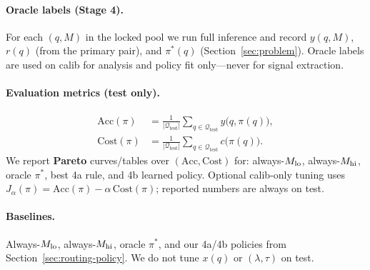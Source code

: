 \paragraph{Oracle labels (Stage 4).}
For each $(q,M)$ in the locked pool we run full inference and record $y(q,M)$, $r(q)$ (from the primary pair), and $\pi^*(q)$ (Section~\ref{sec:problem}).
Oracle labels are used on calib for analysis and policy fit only---never for signal extraction.

\paragraph{Evaluation metrics (test only).}
\begin{align}
  \mathrm{Acc}(\pi) &= \frac{1}{|\mathcal{Q}_{\text{test}}|} \sum_{q\in\mathcal{Q}_{\text{test}}} y\big(q,\pi(q)\big), \\
  \mathrm{Cost}(\pi) &= \frac{1}{|\mathcal{Q}_{\text{test}}|} \sum_{q\in\mathcal{Q}_{\text{test}}} c\big(\pi(q)\big).
\end{align}
We report \textbf{Pareto} curves/tables over $(\mathrm{Acc},\mathrm{Cost})$ for: always-$M_{\mathrm{lo}}$, always-$M_{\mathrm{hi}}$, oracle $\pi^*$, best 4a rule, and 4b learned policy.
Optional calib-only tuning uses $J_\alpha(\pi)=\mathrm{Acc}(\pi)-\alpha\,\mathrm{Cost}(\pi)$; reported numbers are always on test.

\paragraph{Baselines.}
Always-$M_{\mathrm{lo}}$, always-$M_{\mathrm{hi}}$, oracle $\pi^*$, and our 4a/4b policies from Section~\ref{sec:routing-policy}.
We do not tune $x(q)$ or $(\lambda,\tau)$ on test.
